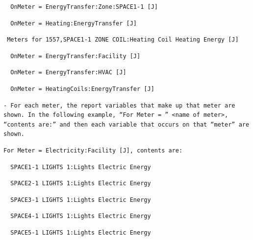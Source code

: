 \begin{lstlisting}
  OnMeter = EnergyTransfer:Zone:SPACE1-1 [J]
\end{lstlisting}

\begin{lstlisting}
  OnMeter = Heating:EnergyTransfer [J]
\end{lstlisting}

\begin{lstlisting}
 Meters for 1557,SPACE1-1 ZONE COIL:Heating Coil Heating Energy [J]
\end{lstlisting}

\begin{lstlisting}
  OnMeter = EnergyTransfer:Facility [J]
\end{lstlisting}

\begin{lstlisting}
  OnMeter = EnergyTransfer:HVAC [J]
\end{lstlisting}

\begin{lstlisting}
  OnMeter = HeatingCoils:EnergyTransfer [J]
\end{lstlisting}

\begin{lstlisting}
- For each meter, the report variables that make up that meter are shown. In the following example, “For Meter = ” <name of meter>, “contents are:” and then each variable that occurs on that “meter” are shown.
\end{lstlisting}

\begin{lstlisting}
For Meter = Electricity:Facility [J], contents are:
\end{lstlisting}

\begin{lstlisting}
  SPACE1-1 LIGHTS 1:Lights Electric Energy
\end{lstlisting}

\begin{lstlisting}
  SPACE2-1 LIGHTS 1:Lights Electric Energy
\end{lstlisting}

\begin{lstlisting}
  SPACE3-1 LIGHTS 1:Lights Electric Energy
\end{lstlisting}

\begin{lstlisting}
  SPACE4-1 LIGHTS 1:Lights Electric Energy
\end{lstlisting}

\begin{lstlisting}
  SPACE5-1 LIGHTS 1:Lights Electric Energy
\end{lstlisting}

